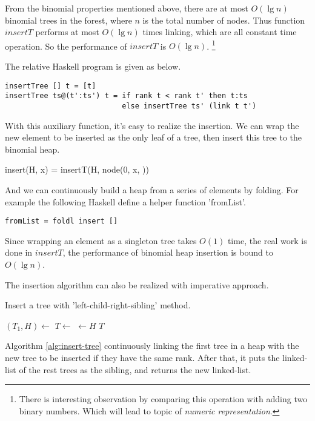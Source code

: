 \documentclass{article}
\begin{document}
From the binomial properties mentioned above, there are at most
$O(\lg n)$ binomial trees in the forest, where $n$ is the total
number of nodes. Thus function $insertT$ performs at most $O(\lg n)$
times linking, which are all constant time operation. So the
performance of $insertT$ is $O(\lg n)$.
\footnote{There is interesting observation by comparing this
operation with adding two binary numbers. Which will lead to
topic of {\em numeric representation}\cite{okasaki-book}.}

The relative Haskell program is given as below.

\lstset{language=Haskell}
\begin{lstlisting}
insertTree [] t = [t]
insertTree ts@(t':ts') t = if rank t < rank t' then t:ts
                           else insertTree ts' (link t t')
\end{lstlisting}

With this auxiliary function, it's easy to realize the insertion.
We can wrap the new element to be inserted as the only leaf of a tree,
then insert this tree to the binomial heap.

\be
insert(H, x) = insertT(H, node(0, x, \phi))
\ee

And we can continuously build a heap from a series of elements by folding.
For example the following Haskell define a helper function 'fromList'.

\begin{lstlisting}
fromList = foldl insert []
\end{lstlisting}

Since wrapping an element as a singleton tree takes $O(1)$ time,
the real work is done in $insertT$, the performance of binomial
heap insertion is bound to $O(\lg n)$.

The insertion algorithm can also be realized with imperative approach.

\begin{algorithm}
\caption{Insert a tree with 'left-child-right-sibling' method.}
\label{alg:insert-tree}
\begin{algorithmic}[1]
    \State $(T_1, H) \gets$ 
    \State $T \gets $ 
  \EndWhile
  \State {} $\gets H$
  \State \Return $T$
\EndFunction
\end{algorithmic}
\end{algorithm}

Algorithm \ref{alg:insert-tree} continuously linking the first tree
in a heap with the new tree to be inserted if they have the same rank.
After that, it puts the linked-list of the rest trees as the sibling,
and returns the new linked-list.
\end{document}
